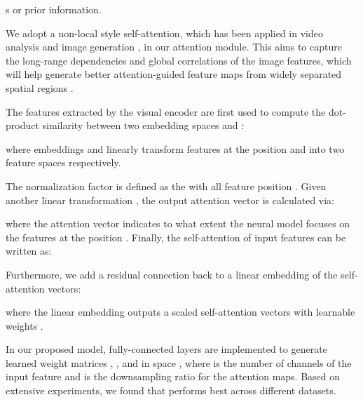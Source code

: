 \documentclass[letterpaper]{article}
\begin{document}
s or prior information.

We adopt a non-local style self-attention, which has been applied in video analysis \cite{wang2018non} and image generation \cite{zhang2018self}, in our attention module. This aims to capture the long-range dependencies and global correlations of the image features, which will help generate better attention-guided feature maps from widely separated spatial regions \cite{wang2018non}.





The features  extracted by the visual encoder are first used to compute the dot-product similarity between two embedding spaces  and :
    
where embeddings  and  linearly transform features at the position  and  into two feature spaces respectively. 

The normalization factor  is defined as the  with all feature position .
Given another linear transformation , the output attention vector  is calculated via:
    
where the attention vector  indicates to what extent the neural model focuses on the features  at the position . Finally, the self-attention of input features  can be written as: 

Furthermore, we add a residual connection back to a linear embedding of the self-attention vectors:

where the linear embedding  outputs a scaled self-attention vectors with learnable weights .

In our proposed model, fully-connected layers are implemented to generate learned weight matrices , ,  and  in space , where  is the number of channels of the input feature  and  is the downsampling ratio for the attention maps. Based on extensive experiments, we found that  performs best across different datasets.
\end{document}

